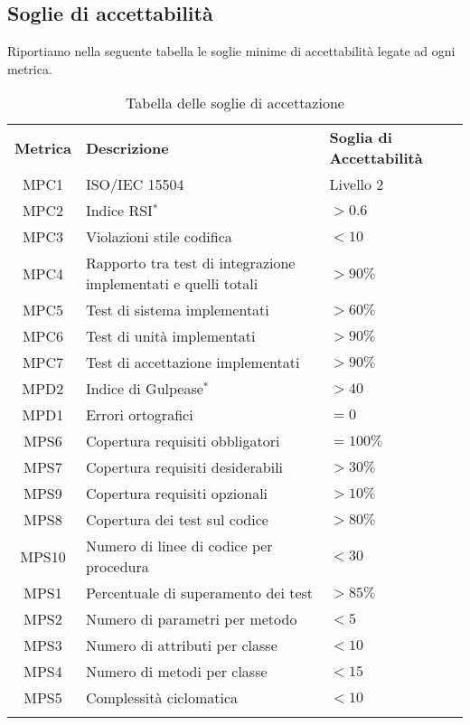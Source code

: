 \subsection{Soglie di accettabilità}
Riportiamo nella seguente tabella le soglie minime di accettabilità legate ad ogni metrica.

\begin{longtable}{| c | p{8cm} | p{2.5cm} |}
	\rowcolor{LightBlue}
	\color{white}\bfseries Metrica & \color{white}\bfseries Descrizione &\color{white}\bfseries Soglia di \newline Accettabilità \\
	MPC1 & ISO/IEC 15504 & Livello 2 \\ \hline
	\rowcolor{LightGray}
	MPC2 & Indice RSI$^*$ & $> 0.6$ \\ \hline
	MPC3 & Violazioni stile codifica & $< 10$ \\ \hline
	\rowcolor{LightGray}
	MPC4 & Rapporto tra test di integrazione implementati e quelli totali & $> 90\%$\\ \hline
	MPC5 & Test di sistema implementati & $> 60\%$\\ \hline
	\rowcolor{LightGray}
	MPC6 & Test di unità implementati & $> 90\%$\\ \hline
	MPC7 & Test di accettazione implementati & $> 90\%$\\ \hline
	\rowcolor{LightGray}
	MPD2 & Indice di Gulpease$^*$ & $> 40$\\ \hline
	MPD1 & Errori ortografici & $= 0$\\ \hline
	\rowcolor{LightGray}
	MPS6 & Copertura requisiti obbligatori & $= 100\%$\\ \hline
	MPS7 & Copertura requisiti desiderabili & $> 30\%$\\ \hline
	\rowcolor{LightGray}
	MPS9 & Copertura requisiti opzionali & $> 10\%$\\ \hline
	MPS8 & Copertura dei test sul codice & $> 80\%$\\ \hline
	\rowcolor{LightGray}
	MPS10 & Numero di linee di codice per procedura & $< 30$ \\ \hline
	MPS1 & Percentuale di superamento dei test & $> 85\%$\\ \hline
	\rowcolor{LightGray}
	MPS2 & Numero di parametri per metodo & $< 5$\\ \hline
	MPS3 & Numero di attributi per classe & $< 10$\\ \hline
	\rowcolor{LightGray}
	MPS4 & Numero di metodi per classe & $< 15$\\ \hline
	MPS5 & Complessità ciclomatica & $< 10$ \\ \hline
	\caption{Tabella delle soglie di accettazione}
\end{longtable}

